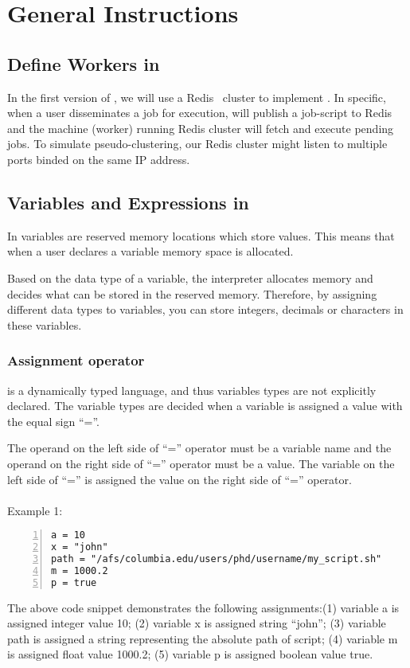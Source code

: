 \section{General Instructions}
\label{sect:general}

\subsection*{Define Workers in \lang{}}
In the first version of \lang{}, we will use a Redis~\cite{redis} cluster to
implement . In specific, when a user disseminates a job for execution,
\lang{} will publish a job-script to Redis and the machine (worker)
running Redis cluster will fetch and execute pending jobs.
To simulate pseudo-clustering, our Redis cluster might listen
to multiple ports binded on the same IP address.

\subsection*{Variables and Expressions in \lang{}}
In \lang{} variables are reserved memory locations which store values. This means that when a user declares a variable
memory space is allocated.

Based on the data type of a variable, the interpreter allocates memory and decides what can be stored in the reserved memory.
Therefore, by assigning different data types to variables, you can store integers, decimals or characters in these variables.

\subsubsection*{Assignment operator}
\lang{}  is a dynamically typed language, and thus variables types are not explicitly declared.
The variable types are decided when a variable is assigned a value with the equal sign ``=''.

The operand on the left side of ``='' operator must be a variable name and the operand on the right side of ``='' operator must be a value.
The variable on the left side of ``='' is assigned the value on the right side of ``='' operator.\\
\\
Example 1:
\begin{Verbatim}[numbers=left]
a = 10
x = "john"
path = "/afs/columbia.edu/users/phd/username/my_script.sh"
m = 1000.2
p = true
\end{Verbatim}

The above code snippet demonstrates the following assignments:(1) variable a is assigned integer value 10; (2) variable x is assigned string ``john''; 
(3) variable path is assigned a string representing the absolute path of script; (4) variable m is assigned float value 1000.2; (5) variable p is assigned boolean value true.

